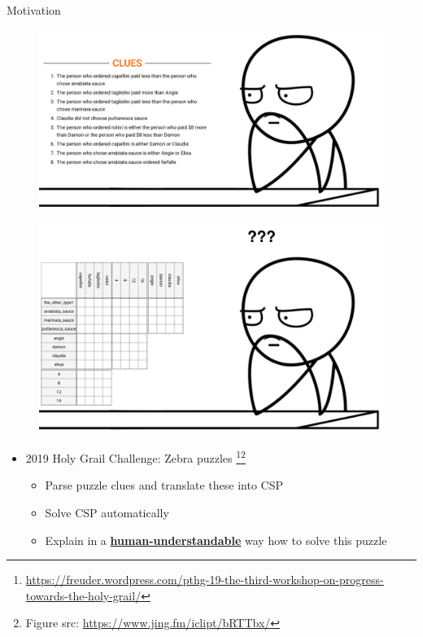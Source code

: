\documentclass{beamer}
\begin{document}
\begin{frame}{Motivation}
    \begin{minipage}[t]{0.48\linewidth}
        \centering
        \vspace{0.46cm}
        \begin{figure}[h]
            \includegraphics[width=\textwidth]{figures/meme_clues}
            \label{clues}
        \end{figure}
    \end{minipage}\hfill
    \begin{minipage}[t]{0.48\linewidth}
        \centering
        \begin{figure}[h]
            \includegraphics[width=\textwidth]{figures/meme}
            \label{grid}
        \end{figure}
    \end{minipage}
    \pause
    \begin{itemize}
        \item 2019 Holy Grail Challenge: Zebra puzzles \footnote{\tiny\url{https://freuder.wordpress.com/pthg-19-the-third-workshop-on-progress-towards-the-holy-grail/}}\footnote{\tiny Figure src: \url{https://www.jing.fm/iclipt/bRTTbx/}}
              \begin{itemize}
                  \item Parse puzzle clues and translate these into CSP\pause
                  \item Solve CSP automatically\pause
                  \item Explain in a \textbf{\underline{human-understandable}} way how to solve this puzzle
              \end{itemize}
    \end{itemize}
        

\end{frame}
\end{document}
